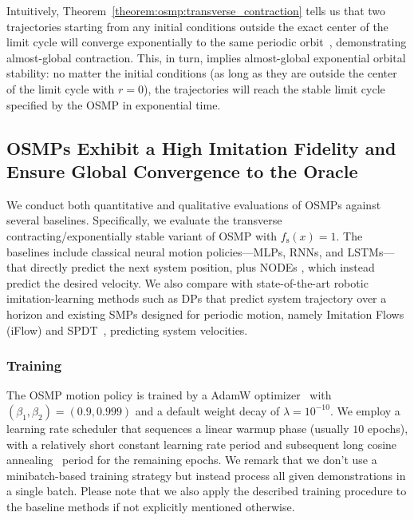 Intuitively, Theorem~\ref{theorem:osmp:transverse_contraction} tells us that two trajectories starting from any initial conditions outside the exact center of the limit cycle will converge exponentially to the same periodic orbit~\citep{manchester2014transverse}, demonstrating almost-global contraction. This, in turn, implies almost-global exponential orbital stability: no matter the initial conditions (as long as they are outside the center of the limit cycle with $r = 0$), the trajectories will reach the stable limit cycle specified by the \gls{OSMP} in exponential time.

\subsection{OSMPs Exhibit a High Imitation Fidelity and Ensure Global Convergence to the Oracle}\label{sub:osmp:osmp_benchmarking}

We conduct both quantitative and qualitative evaluations of \glspl{OSMP} against several baselines. 
Specifically, we evaluate the transverse contracting/exponentially stable variant of \gls{OSMP} with $f_\mathrm{s}(x) = 1$.
The baselines include classical neural motion policies—\glspl{MLP}, \glspl{RNN}, and \glspl{LSTM}—that directly predict the next system position, plus \glspl{NODE} \citep{chen2018neural}, which instead predict the desired velocity. We also compare with state-of-the-art robotic imitation-learning methods such as \glspl{DP} that predict system trajectory over a horizon and existing \glspl{SMP} designed for periodic motion, namely Imitation Flows (iFlow) \citep{urain2020imitationflow} and \gls{SPDT}~\citep{zhi2024teaching}, predicting system velocities.

\subsubsection{Training}
The OSMP motion policy is trained by a AdamW optimizer~\citep{kingma2014adam, loshchilov2018decoupled} with $(\beta_1, \beta_2) = (0.9, 0.999)$ and a default weight decay of $\lambda = 1 0^{-10}$.
We employ a learning rate scheduler that sequences a linear warmup phase (usually $10$ epochs), with a relatively short constant learning rate period and subsequent long cosine annealing~\citep{loshchilov2016sgdr} period for the remaining epochs. 
We remark that we don't use a minibatch-based training strategy but instead process all given demonstrations in a single batch.
Please note that we also apply the described training procedure to the baseline methods if not explicitly mentioned otherwise.

